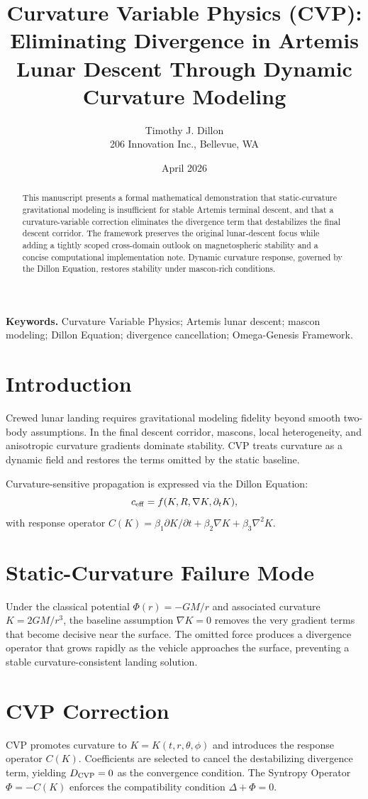 \documentclass[11pt,a4paper]{article}
\title{Curvature Variable Physics (CVP): Eliminating Divergence in Artemis Lunar Descent Through Dynamic Curvature Modeling}
\author{Timothy J. Dillon \\ 206 Innovation Inc., Bellevue, WA}
\date{April 2026}
\begin{document}
\maketitle

\begin{abstract}
This manuscript presents a formal mathematical demonstration that static-curvature gravitational modeling is insufficient for stable Artemis terminal descent, and that a curvature-variable correction eliminates the divergence term that destabilizes the final descent corridor. The framework preserves the original lunar-descent focus while adding a tightly scoped cross-domain outlook on magnetospheric stability and a concise computational implementation note. Dynamic curvature response, governed by the Dillon Equation, restores stability under mascon-rich conditions.
\end{abstract}

\textbf{Keywords.} Curvature Variable Physics; Artemis lunar descent; mascon modeling; Dillon Equation; divergence cancellation; Omega-Genesis Framework.

\section{Introduction}
Crewed lunar landing requires gravitational modeling fidelity beyond smooth two-body assumptions. In the final descent corridor, mascons, local heterogeneity, and anisotropic curvature gradients dominate stability. CVP treats curvature as a dynamic field and restores the terms omitted by the static baseline.

Curvature-sensitive propagation is expressed via the Dillon Equation:
\[
c_{\rm eff} = f(K, R, \nabla K, \partial_t K),
\]
with response operator \(C(K) = \beta_1 \partial K/\partial t + \beta_2 \nabla K + \beta_3 \nabla^2 K\).

\section{Static-Curvature Failure Mode}
Under the classical potential \(\Phi(r) = -GM/r\) and associated curvature \(K = 2GM/r^3\), the baseline assumption \(\nabla K = 0\) removes the very gradient terms that become decisive near the surface. The omitted force produces a divergence operator that grows rapidly as the vehicle approaches the surface, preventing a stable curvature-consistent landing solution.

\section{CVP Correction}
CVP promotes curvature to \(K = K(t,r,\theta,\phi)\) and introduces the response operator \(C(K)\). Coefficients are selected to cancel the destabilizing divergence term, yielding \(D_{\rm CVP} = 0\) as the convergence condition. The Syntropy Operator \(\Phi = -C(K)\) enforces the compatibility condition \(\Delta + \Phi = 0\).
\end{document}
